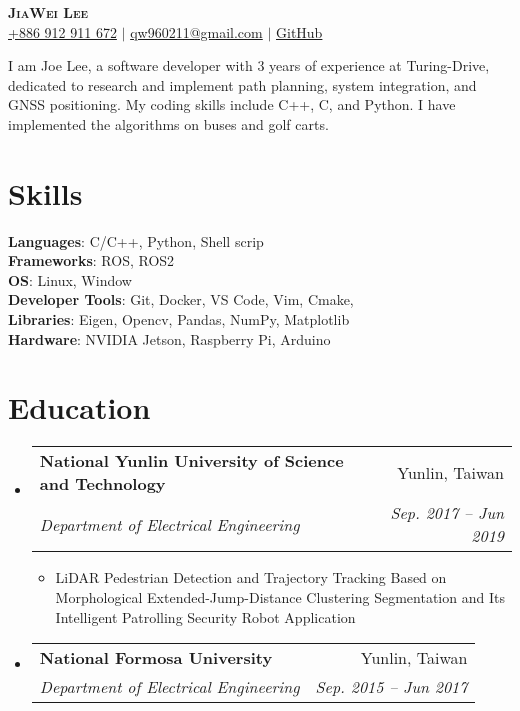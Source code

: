 \documentclass[letterpaper,11pt]{article}
\makeatletter
\newcommand{\resumeItem}[1]{
  \item\small{
    {#1 \vspace{-2pt}}
  }
}
\newcommand{\resumeSubheading}[4]{
  \vspace{-2pt}\item
    \begin{tabular*}{0.97\textwidth}[t]{l@{\extracolsep{\fill}}r}
      \textbf{#1} & #2 \\
      \textit{\small#3} & \textit{\small #4} \\
    \end{tabular*}\vspace{-7pt}
}
\newcommand{\resumeSubHeadingListStart}{\begin{itemize}[leftmargin=0.15in, label={}]}
\newcommand{\resumeSubHeadingListEnd}{\end{itemize}}
\newcommand{\resumeItemListStart}{\begin{itemize}}
\newcommand{\resumeItemListEnd}{\end{itemize}\vspace{-5pt}}
\makeatother
\begin{document}
\begin{center}
    \textbf{\Huge \scshape JiaWei Lee} \\ \vspace{3pt}
    \faMobile \hspace{.5pt} \href{tel:0912911672}{\color{blue}+886 912 911 672} $|$
    \faAt \hspace{.5pt} \href{mailto:qw960211@gmail.com}{\color{blue}qw960211@gmail.com} $|$
    \faGithub \hspace{.5pt} \href{https://github.com/EC404}{\color{blue}GitHub}
\end{center}

{I am Joe Lee, a software developer with 3 years of experience at Turing-Drive, dedicated to research and implement path planning, system integration, and GNSS positioning. My coding skills include C++, C, and Python. I have implemented the algorithms on buses and golf carts.} \\

\section{\textbf{Skills}}
 \begin{itemize}[leftmargin=0.15in, label={}]
    \small{\item{
     \textbf{Languages}{: C/C++, Python, Shell scrip} \\
     \textbf{Frameworks}{: ROS, ROS2} \\
     \textbf{OS}{: Linux, Window} \\
     \textbf{Developer Tools}{: Git, Docker, VS Code, Vim, Cmake, } \\
     \textbf{Libraries}{: Eigen, Opencv, Pandas, NumPy, Matplotlib} \\
     \textbf{Hardware}{: NVIDIA Jetson, Raspberry Pi, Arduino}
    }}
 \end{itemize}

\section{\textbf{Education}}
  \vspace{3pt}
  \resumeSubHeadingListStart
    \resumeSubheading
      {National Yunlin University of  Science and Technology}{Yunlin, Taiwan}
      {Department of Electrical Engineering}{Sep. 2017 -- Jun 2019}
      \resumeItemListStart
        \resumeItem{LiDAR Pedestrian Detection and Trajectory Tracking Based on Morphological Extended-Jump-Distance  Clustering Segmentation and Its Intelligent Patrolling  Security Robot Application}
      \resumeItemListEnd
    \resumeSubheading
      {National Formosa University}{Yunlin, Taiwan}
      {Department of Electrical Engineering}{Sep. 2015 -- Jun 2017}
  \resumeSubHeadingListEnd
\end{document}
